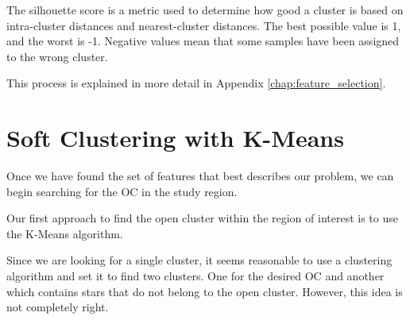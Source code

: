 \documentclass[11pt, a4paper, english]{book}
\begin{document}
The silhouette score is a metric used to determine how good a cluster is based on intra-cluster distances and nearest-cluster distances.
The best possible value is 1, and the worst is -1. Negative values mean that some samples have been assigned to the wrong cluster.

This process is explained in more detail in Appendix \ref{chap:feature_selection}.

\section{Soft Clustering with K-Means}

Once we have found the set of features that best describes our problem, we can begin searching for the OC in the study region.

Our first approach to find the open cluster within the region of interest is to use the K-Means algorithm.

Since we are looking for a single cluster, it seems reasonable to use a clustering algorithm and set it to find two clusters.
One for the desired OC and another which contains stars that do not belong to the open cluster.
However, this idea is not completely right.
\end{document}

